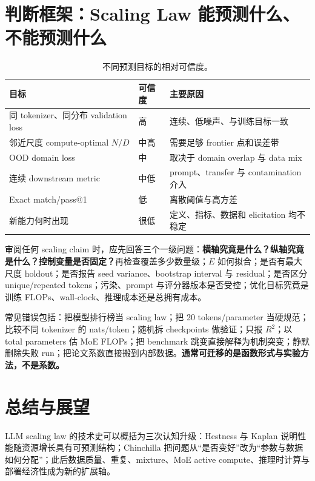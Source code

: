 \documentclass[UTF8,10pt,a4paper,fontset=none]{ctexart}
\begin{document}
\section{判断框架：Scaling Law 能预测什么、不能预测什么}

\begin{table}[htbp]
\centering
\caption{不同预测目标的相对可信度。}
\label{tab:predictability}
\begin{tabularx}{\textwidth}{Y C{2.0cm} Y}
\toprule
目标 & 可信度 & 主要原因 \\
\midrule
同 tokenizer、同分布 validation loss & 高 & 连续、低噪声、与训练目标一致 \\
邻近尺度 compute-optimal $N/D$ & 中高 & 需要足够 frontier 点和误差带 \\
OOD domain loss & 中 & 取决于 domain overlap 与 data mix \\
连续 downstream metric & 中低 & prompt、transfer 与 contamination 介入 \\
Exact match/pass@1 & 低 & 离散阈值与高方差 \\
新能力何时出现 & 很低 & 定义、指标、数据和 elicitation 均不稳定 \\
\bottomrule
\end{tabularx}
\end{table}

审阅任何 scaling claim 时，应先回答三个一级问题：\textbf{横轴究竟是什么？纵轴究竟是什么？控制变量是否固定？}再检查覆盖多少数量级；$E$ 如何拟合；是否有最大尺度 holdout；是否报告 seed variance、bootstrap interval 与 residual；是否区分 unique/repeated tokens；污染、prompt 与评分器版本是否受控；优化目标究竟是训练 FLOPs、wall-clock、推理成本还是总拥有成本。

常见错误包括：把模型排行榜当 scaling law；把 20 tokens/parameter 当硬规范；比较不同 tokenizer 的 nats/token；随机拆 checkpoints 做验证；只报 $R^2$；以 total parameters 估 MoE FLOPs；把 benchmark 跳变直接解释为机制突变；静默删除失败 run；把论文系数直接搬到内部数据。\textbf{通常可迁移的是函数形式与实验方法，不是系数。}

\section{总结与展望}

LLM scaling law 的技术史可以概括为三次认知升级：Hestness 与 Kaplan 说明性能随资源增长具有可预测结构；Chinchilla 把问题从“是否变好”改为“参数与数据如何分配”；此后数据质量、重复、mixture、MoE active compute、推理时计算与部署经济性成为新的扩展轴。
\end{document}
